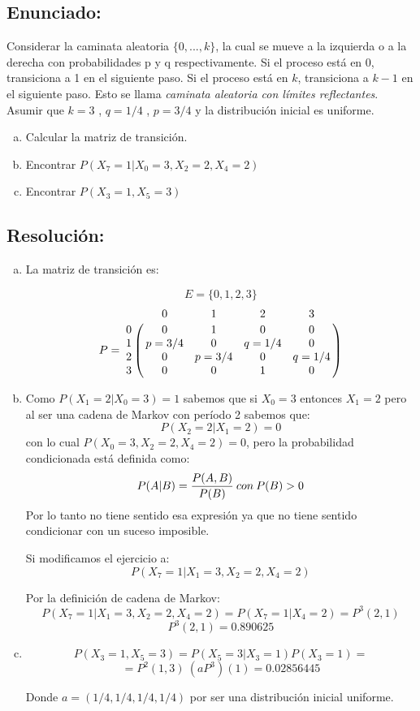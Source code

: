 \documentclass{article}
\begin{document}
\subsection*{Enunciado:}
Considerar la caminata aleatoria $\{0,...,k\}$, la cual se mueve a la izquierda o a la derecha con probabilidades p y q respectivamente. Si el proceso está en 0, transiciona a 1 en el siguiente paso. Si el proceso está en $k$, transiciona a $k-1$ en el siguiente paso. Esto se llama \textit{caminata aleatoria con límites reflectantes}. Asumir que $k = 3$ , $q = 1/4$ , $p = 3/4$ y la distribución inicial es uniforme.

\begin{enumerate}[(a)] 

\item Calcular la matriz de transición.
\item Encontrar $P(X_7 = 1 | X_0 = 3, X_2 = 2, X_4 = 2)$
\item Encontrar $P(X_3 = 1, X_5 = 3)$
\end{enumerate}

\subsection*{Resolución:}


\begin{enumerate}[(a)] 
\item La matriz de transición es:

$$ E = \{ 0,1,2,3\} $$
$$
P = 
\bordermatrix{ 
\text{} & 0 & 1 & 2 & 3\cr
0 & 0       & 1       & 0       & 0 \cr
1 & p = 3/4 & 0       & q = 1/4 & 0 \cr
2 & 0       & p = 3/4 & 0       & q = 1/4 \cr
3 & 0       & 0       & 1       & 0
}
$$


\item 
Como $P(X_1 = 2 | X_0 = 3) = 1$ sabemos que si $X_0 = 3$ entonces $X_1 = 2$ pero al ser una cadena de Markov con período 2 sabemos que: $$P(X_2 = 2 | X_1 = 2) = 0$$ con lo cual $P(X_0 = 3, X_2 = 2, X_4 = 2) = 0$, pero la probabilidad condicionada está definida como: $$P(A|B) = {P(A,B)\over P(B)} \: con \:  P(B) > 0$$ Por lo tanto no tiene sentido esa expresión ya que no tiene sentido condicionar con un suceso imposible. 

Si modificamos el ejercicio a: $$P(X_7 = 1 | X_1 = 3, X_2 = 2, X_4 = 2) $$ 

Por la definición de cadena de Markov: $$P(X_7 = 1 | X_1 = 3, X_2 = 2, X_4 = 2) = P(X_7 = 1 | X_4 = 2) = P^{3}(2,1)$$
$$P^{3}(2,1) = 0.890625 $$



\item $$P(X_3 = 1, X_5 = 3) = P(X_5 = 3 | X_3 = 1) P(X_3 = 1)  = $$ $$= P^2(1,3) \: (a P^3)(1)  = 0.02856445$$ 

Donde $a = (1/4,1/4,1/4,1/4)$ por ser una distribución inicial uniforme.


\end{enumerate}
\end{document}
